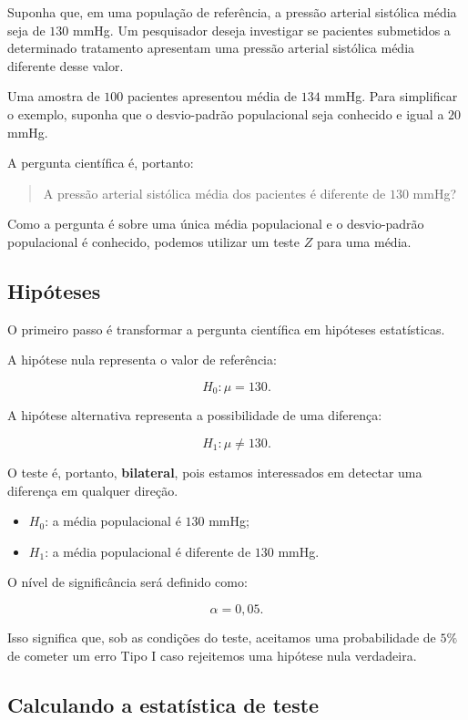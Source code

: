 Suponha que, em uma população de referência, a pressão arterial sistólica
média seja de $130$ mmHg. Um pesquisador deseja investigar se pacientes
submetidos a determinado tratamento apresentam uma pressão arterial sistólica
média diferente desse valor.

Uma amostra de $100$ pacientes apresentou média de $134$ mmHg. Para simplificar
o exemplo, suponha que o desvio-padrão populacional seja conhecido e igual a
$20$ mmHg.

A pergunta científica é, portanto:

\begin{quote}
A pressão arterial sistólica média dos pacientes é diferente de
$130$ mmHg?
\end{quote}

Como a pergunta é sobre uma única média populacional e o desvio-padrão
populacional é conhecido, podemos utilizar um teste $Z$ para uma média.

\subsection{Hipóteses}

O primeiro passo é transformar a pergunta científica em hipóteses
estatísticas.

A hipótese nula representa o valor de referência:

\[
H_0:\mu=130.
\]

A hipótese alternativa representa a possibilidade de uma diferença:

\[
H_1:\mu\neq130.
\]

O teste é, portanto, \textbf{bilateral}, pois estamos interessados em detectar
uma diferença em qualquer direção.

\begin{itemize}
    \item $H_0$: a média populacional é $130$ mmHg;
    \item $H_1$: a média populacional é diferente de $130$ mmHg.
\end{itemize}

O nível de significância será definido como:

\[
\alpha=0{,}05.
\]

Isso significa que, sob as condições do teste, aceitamos uma probabilidade de
$5\%$ de cometer um erro Tipo I caso rejeitemos uma hipótese nula verdadeira.

\subsection{Calculando a estatística de teste}

